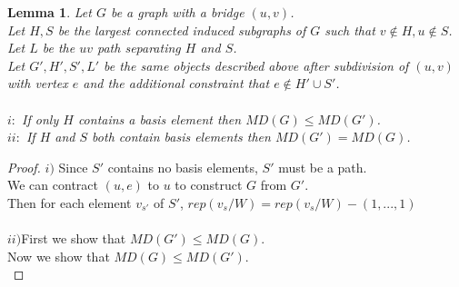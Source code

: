 \documentclass[11pt]{amsart}
\theoremstyle{plain}  %
\newtheorem{lem}[thm]{Lemma}
\theoremstyle{definition}
\theoremstyle{remark}
\numberwithin{equation}{thm}
\begin{document}
\begin{lem}
 Let $G$ be a graph with a bridge $(u,v)$.\\
 Let $H, S$ be the largest connected induced subgraphs of $G$ such that $v\notin H, u\notin S$.\\
 Let $L$ be the $uv$ path separating $H$ and $S$.\\
 Let $G', H', S', L'$ be the same objects described above after subdivision of $(u,v)$ with vertex $e$ and the additional constraint that
 $e \notin H' \cup S'$.\\
 \\
 $i:$ If only $H$ contains a basis element then $MD(G)\leq MD(G')$.\\
 $ii:$ If $H$ and $S$ both contain basis elements then $MD(G')= MD(G)$.
\end{lem}
\begin{proof}
 $i)$ Since $S'$ contains no basis elements, $S'$ must be a path.\\
 We can contract $(u,e)$ to $u$ to construct $G$ from $G'$.\\
 Then for each element $v_{s'}$ of $S'$, $rep(v_s/W) = rep(v_s/W) - (1,...,1)$\\ 
 \\$ii)$First we show that $MD(G')\leq MD(G)$.\\
 Now we show that $MD(G)\leq MD(G')$.\\
\end{proof}


 






\cite{Chartrand:2010:GDF:1941879}
\nocite{*}

\end{document}
